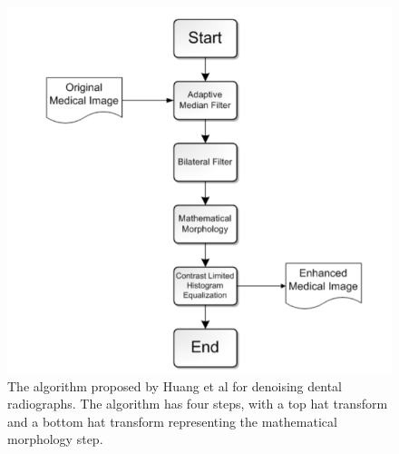 \documentclass[a4paper,titlepage,12pt]{article}
\begin{document}
\begin{figure}
\centering
\includegraphics[width=0.7\linewidth]{preprocess/algorithm.png}
  \caption{
		The algorithm proposed by Huang et al \cite{JBEMI1893} for denoising dental radiographs. The algorithm has four steps, with a top hat transform and a bottom hat transform representing the mathematical morphology step. } \label{preprocessalgo}
\end{figure}
\end{document}
